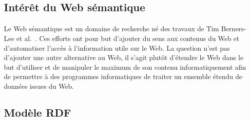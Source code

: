 \subsection{Intérêt du Web sémantique}
\paragraph{}
Le Web sémantique est un domaine de recherche né des travaux de Tim Berners-Lee et al.~\cite{Berners-lee2001}. Ces efforts ont pour but d'ajouter du sens aux contenus du Web et d'automatiser l'accès à l'information utile sur le Web. La question n’est pas d'ajouter une autre alternative au Web, il s’agit plutôt d'étendre le Web dans le but d'utiliser et de manipuler le maximum de son contenu informatiquement afin de permettre à des programmes informatiques de traiter un ensemble étendu de données issues du Web.
\subsection{Modèle RDF}
